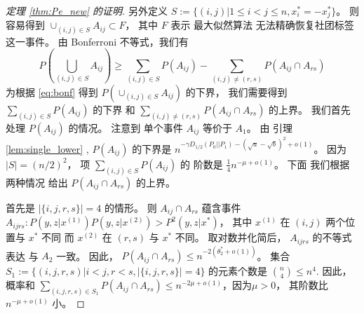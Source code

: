 \begin{proof}[定理 \ref{thm:Pe_new} 的证明]
另外定义 $S:=\{(i,j)| 1\leq i < j\leq n,
x_i^*=-x_j^*
\}$。
则容易得到 $\cup_{(i,j) \in S} A_{ij} \subset F$，
其中 $F$ 表示 最大似然算法 无法精确恢复社团标签
这一事件。
由 Bonferroni 不等式，我们有
\begin{equation}\label{eq:bonf}
	P(\bigcup_{(i,j)\in S} A_{ij}) \geq
	\sum_{(i,j)\in S} P(A_{ij})
	- \sum_{(i,j) \neq (r,s)} P(A_{ij} \cap A_{rs})		
\end{equation}
为根据 \eqref{eq:bonf}
得到
$P(\cup_{(i,j)\in S} A_{ij})$
的下界，
我们需要得到 $\sum_{(i,j)\in S} P(A_{ij})$
的下界 和
$\sum_{(i,j) \neq (r,s)} P(A_{ij} \cap A_{rs})$
的上界。
我们首先 处理 $P(A_{ij})$ 的情况。
注意到 单个事件 $A_{ij}$
等价于 $A_1$。
由 引理 \ref{lem:single_lower} ,
$P(A_{ij})$ 的下界是
$n^{-\gamma D_{1/2}(P_0 || P_1)-(\sqrt{a} - \sqrt{b})^2 +o(1)}$。
因为
$|S|=(n/2)^2$，
项 $\sum_{(i,j) \in S} P(A_{ij})$ 的 阶数是 
$\frac{1}{4}n^{-\mu+o(1)}$。
下面 我们根据两种情况 给出 $P(A_{ij} \cap A_{rs})$ 的上界。

首先是  $|\{i,j,r,s\}|=4$
的情形。 则 $A_{ij} \cap A_{rs}$ 蕴含事件
$A_{ijrs}: P(y,z|x^{(1)})P(y,z|x^{(2)}) > P^2(y,z|x^*)$，
其中 $x^{(1)}$ 在 $(i,j)$ 两个位置与 $x^*$ 不同
而 $x^{(2)}$ 在 $(r,s)$ 与 $x^*$
不同。
取对数并化简后，
$A_{ijrs}$ 的不等式表达
与 $A_2$ 一致。
因此， $P(A_{ij} \cap A_{rs}) \leq n^{-2(\theta^*_2 + o(1))} $。
集合 $S_1:=\{(i,j,r,s)| i<j, r<s, |\{i,j,r,s\}|=4\}$
的元素个数是 $\binom{n}{4} \leq n^4$.
因此，概率和
$\sum_{(i,j,r,s) \in S_1} P(A_{ij} \cap A_{rs})
\leq n^{-2\mu +o(1)}$，因为$\mu > 0$，
其阶数比 $n^{-\mu+o(1)}$ 小。


\end{proof}
